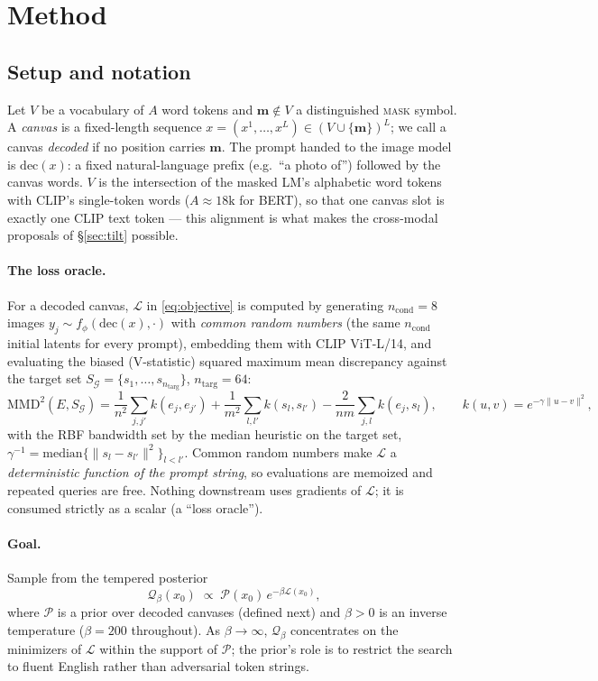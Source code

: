 \documentclass[11pt]{article}
\newcommand{\G}{\mathcal{G}}
\newcommand{\Ploss}{\mathcal{L}}
\newcommand{\Pd}{\mathcal{P}}
\newcommand{\dec}{\mathrm{dec}}
\newcommand{\mask}{\mathbf{m}}
\begin{document}
\section{Method}
\label{sec:method}

\subsection{Setup and notation}
\label{sec:notation}
Let $V$ be a vocabulary of $A$ word tokens and $\mask \notin V$ a
distinguished \textsc{mask} symbol. A \emph{canvas} is a fixed-length
sequence $x = (x^1, \dots, x^{L}) \in (V \cup \{\mask\})^{L}$; we call a
canvas \emph{decoded} if no position carries $\mask$. The prompt handed to
the image model is $\dec(x)$: a fixed natural-language prefix (e.g.\ ``a
photo of'') followed by the canvas words. $V$ is the intersection of the
masked LM's alphabetic word tokens with CLIP's single-token words
($A \approx 18\mathrm{k}$ for BERT), so that one canvas slot is exactly one
CLIP text token --- this alignment is what makes the cross-modal proposals
of \S\ref{sec:tilt} possible.

\paragraph{The loss oracle.} For a decoded canvas, $\Ploss$ in
\eqref{eq:objective} is computed by generating $n_{\mathrm{cond}}{=}8$
images $y_j \sim f_\phi(\dec(x), \cdot)$ with \emph{common random numbers}
(the same $n_{\mathrm{cond}}$ initial latents for every prompt), embedding
them with CLIP ViT-L/14, and evaluating the biased (V-statistic) squared
maximum mean discrepancy against the target set
$S_\G = \{s_1,\dots,s_{n_{\mathrm{targ}}}\}$, $n_{\mathrm{targ}}{=}64$:
\begin{equation}
\mathrm{MMD}^2(E, S_\G)
= \frac{1}{n^2}\!\sum_{j,j'} k(e_j, e_{j'})
+ \frac{1}{m^2}\!\sum_{l,l'} k(s_l, s_{l'})
- \frac{2}{nm}\!\sum_{j,l} k(e_j, s_l),
\qquad
k(u,v) = e^{-\gamma \|u - v\|^2},
\end{equation}
with the RBF bandwidth set by the median heuristic on the target set,
$\gamma^{-1} = \mathrm{median}\{\|s_l - s_{l'}\|^2\}_{l<l'}$. Common random
numbers make $\Ploss$ a \emph{deterministic function of the prompt string},
so evaluations are memoized and repeated queries are free. Nothing
downstream uses gradients of $\Ploss$; it is consumed strictly as a scalar
(a ``loss oracle'').

\paragraph{Goal.} Sample from the tempered posterior
\begin{equation}
\label{eq:tempered}
\mathcal{Q}_\beta(x_0) \;\propto\; \Pd(x_0)\, e^{-\beta \Ploss(x_0)},
\end{equation}
where $\Pd$ is a prior over decoded canvases (defined next) and
$\beta > 0$ is an inverse temperature ($\beta{=}200$ throughout). As
$\beta \to \infty$, $\mathcal{Q}_\beta$ concentrates on the minimizers of
$\Ploss$ within the support of $\Pd$; the prior's role is to restrict the
search to fluent English rather than adversarial token strings.
\end{document}
